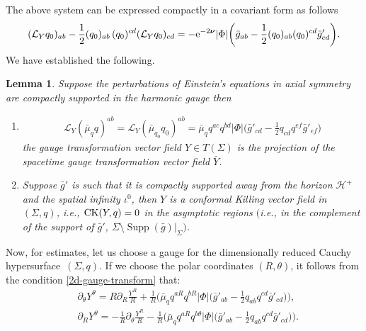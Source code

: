 \documentclass[11pt]{article}
\numberwithin{equation}{section}
\def\ptl{\partial}%
\def\mbo#1{\boldsymbol{#1}}%
\def\halb{\frac{1}{2}}%
\numberwithin{equation}{section}
\newtheorem{Lemma}[Theorem]{Lemma}
\begin{document}
 The above system can be expressed compactly in a covariant form as follows
\begin{align*}
(\mathcal{L}_{Y} q_0)_{ab} - \halb (q_0)_{ab}\, (q_0)^{cd} (\mathcal{L}_{Y} q_0)_{cd}=-{\rm e}^{-2 \mbo{\nu}} \vert \Phi \vert \biggl(\bar{g}_{ab} - \halb (q_0)_{ab} (q_0)^{cd} \bar{g}'_{cd} \biggr).
\end{align*}
We have established the following.
\begin{Lemma} \label{Y-conformal-killing}
	Suppose the perturbations of Einstein's equations in axial symmetry are compactly supported in the harmonic gauge then
	\begin{enumerate}\itemsep=0pt
		\item[$(1)$] 	
		\begin{align} \label{2d-gauge-transform}
		\mathcal{L}_Y (\bar{\mu}_q q) ^{ab} = \mathcal{L}_Y (\bar{\mu}_{q_0} q_0) ^{ab}= \bar{\mu}_q q^{ac} q^{bd} \vert \Phi \vert \biggl(\bar{g}'_{cd} - \halb q_{cd} q^{ef} \bar{g}'_{ef}\biggr)
		\end{align}
		the gauge transformation vector field $Y \in T(\Sigma)$ is the projection of the spacetime gauge transformation vector field $\bar{Y}$.
	
	\item[$(2)$] Suppose $\bar{g}'$ is such that it is compactly supported away from the horizon $\mathcal{H^+}$ and the spatial infinity $\iota^0$, then $Y$	is a conformal Killing vector field in $(\Sigma, q)$, i.e., ${\rm CK}(Y, q) = 0$ in the asymptotic regions $($i.e., in the complement of the support of $\bar{g}'$, $\Sigma \setminus \operatorname{Supp}(\bar{g}) \vert_{\Sigma})$.
\end{enumerate}
\end{Lemma}

Now, for estimates, let us choose a gauge for the dimensionally reduced Cauchy hypersurface~$(\Sigma, q)$. If we choose the polar coordinates $(R, \theta)$, it follows from the condition \eqref{2d-gauge-transform} that:
\begin{subequations}\label{Y-theta-transport}
\begin{align}
&\ptl_ \theta Y^\theta= R \ptl_R \frac{Y^R}{R} + \frac{1}{R} \biggl(\bar{\mu}_q q^{aR} q^{bR} \vert \Phi \vert \biggl(\bar{g}'_{ab} - \halb q_{ab} q^{cd} \bar{g}'_{cd}\biggr) \biggr), \\
&\ptl_R Y^\theta= - \frac{1}{R} \ptl_\theta \frac{Y^R}{R} - \frac{1}{R} \biggl(\bar{\mu}_q q^{aR} q^{b\theta} \vert \Phi \vert \biggl(\bar{g}'_{ab} - \halb q_{ab} q^{cd} \bar{g}'_{cd}\biggr)\biggr).
\end{align}
\end{subequations}
\end{document}
